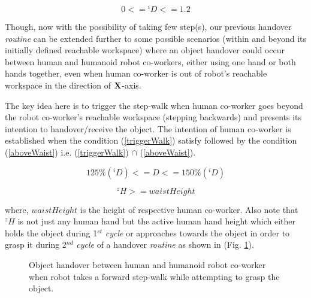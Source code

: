 \begin{equation}\label{Di_range}
	0 <= {}^{i}D <= 1.2
\end{equation}


Though, now with the possibility of taking few step(s), our previous handover \textit{routine} can be extended further to some possible scenarios (within and beyond its initially defined reachable workspace) where an object handover could occur between human and humanoid robot co-workers, either using one hand or both hands together, even when human co-worker is out of robot's reachable workspace in the direction of $\bf{X}$-axis. 

The key idea here is to trigger the step-walk when human co-worker goes beyond the robot co-worker's reachable workspace (stepping backwards) and presents its intention to handover/receive the object. The intention of human co-worker is established when the condition (\ref{triggerWalk}) satisfy followed by the condition (\ref{aboveWaist}) i.e.  (\ref{triggerWalk}) $\cap$ (\ref{aboveWaist}).

\begin{equation}\label{triggerWalk}
		125\%({}^{i}D) <= D <= 150\%({}^{i}D)
\end{equation}

\begin{equation}\label{aboveWaist}
		{}^{z}H >= waistHeight
\end{equation}

where, $ waistHeight $ is the height of respective human co-worker. Also note that $ {}^{z}H $ is not just any human hand but the active human hand height which either holds the object during 1$ {}^{st} $ \textit{cycle} or approaches towards the object in order to grasp it during 2$ {}^{nd} $ \textit{cycle} of a handover \textit{routine} as shown in (Fig. \ref{fig:handoverWalk}).


\begin{figure}[hptb]
	\caption{Object handover between human and humanoid robot co-worker when robot takes a forward step-walk while attempting to grasp the object.}
	\label{fig:handoverWalk}
\end{figure}

